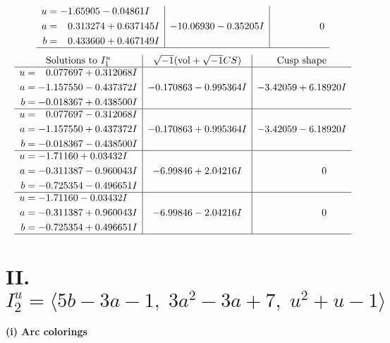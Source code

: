 \documentclass[1p]{elsarticle_modified}
\theoremstyle{definition}
\newcommand{\I}{\sqrt{-1}}
\begin{document}
$$\begin{array}{c|c|c}
\begin{aligned}
u &= -1.65905 - 0.04861 I \\
a &= \phantom{-}0.313274 + 0.637145 I \\
b &= \phantom{-}0.433660 + 0.467149 I\end{aligned}
 & -10.06930 - 0.35205 I & \phantom{-0.000000 } 0\\
 \hline 
 \end{array}$$\newpage$$\begin{array}{c|c|c}  
\text{Solutions to }I^u_{1}& \I (\text{vol} + \sqrt{-1}CS) & \text{Cusp shape}\\
 \hline 
\begin{aligned}
u &= \phantom{-}0.077697 + 0.312068 I \\
a &= -1.157550 - 0.437372 I \\
b &= -0.018367 + 0.438500 I\end{aligned}
 & -0.170863 - 0.995364 I & -3.42059 + 6.18920 I \\ \hline\begin{aligned}
u &= \phantom{-}0.077697 - 0.312068 I \\
a &= -1.157550 + 0.437372 I \\
b &= -0.018367 - 0.438500 I\end{aligned}
 & -0.170863 + 0.995364 I & -3.42059 - 6.18920 I \\ \hline\begin{aligned}
u &= -1.71160 + 0.03432 I \\
a &= -0.311387 - 0.960043 I \\
b &= -0.725354 - 0.496651 I\end{aligned}
 & -6.99846 + 2.04216 I & \phantom{-0.000000 } 0 \\ \hline\begin{aligned}
u &= -1.71160 - 0.03432 I \\
a &= -0.311387 + 0.960043 I \\
b &= -0.725354 + 0.496651 I\end{aligned}
 & -6.99846 - 2.04216 I & \phantom{-0.000000 } 0\\
 \hline 
 \end{array}$$\newpage\newpage\renewcommand{\arraystretch}{1}
\centering \section*{II. $I^u_{2}= \langle 5 b-3 a-1,\;3 a^2-3 a+7,\;u^2+u-1 \rangle$}
\flushleft \textbf{(i) Arc colorings}\\
\end{document}
